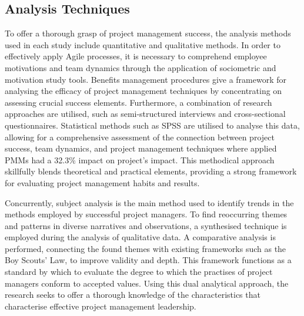 \documentclass{article}
\begin{document}

\subsection{Analysis Techniques}

To offer a thorough grasp of project management success, the analysis methods used in each study include quantitative and qualitative methods. In order to effectively apply Agile processes, it is necessary to comprehend employee motivations and team dynamics through the application of sociometric and motivation study tools. Benefits management procedures give a framework for analysing the efficacy of project management techniques by concentrating on assessing crucial success elements. Furthermore, a combination of research approaches are utilised, such as semi-structured interviews and cross-sectional questionnaires. Statistical methods such as SPSS are utilised to analyse this data, allowing for a comprehensive assessment of the connection between project success, team dynamics, and project management techniques where applied PMMs had a 32.3\% impact on project's impact. This methodical approach skillfully blends theoretical and practical elements, providing a strong framework for evaluating project management habits and results.

Concurrently, subject analysis is the main method used to identify trends in the methods employed by successful project managers. To find reoccurring themes and patterns in diverse narratives and observations, a synthesised technique is employed during the analysis of qualitative data. A comparative analysis is performed, connecting the found themes with existing frameworks such as the Boy Scouts' Law, to improve validity and depth. This framework functions as a standard by which to evaluate the degree to which the practises of project managers conform to accepted values. Using this dual analytical approach, the research seeks to offer a thorough knowledge of the characteristics that characterise effective project management leadership.
\end{document}
